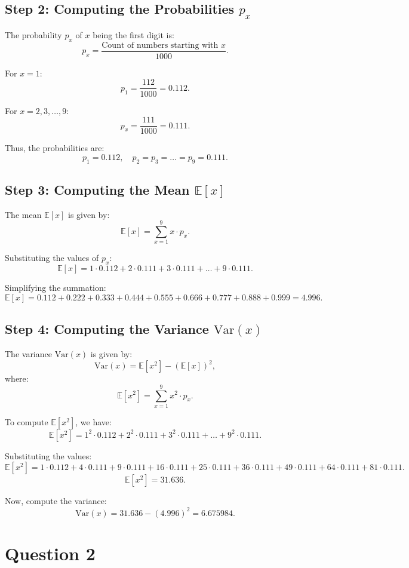 \documentclass[12pt]{article}
\begin{document}
\subsection*{Step 2: Computing the Probabilities \( p_x \)}

The probability \( p_x \) of \( x \) being the first digit is:
\[
p_x = \frac{\text{Count of numbers starting with } x}{1000}.
\]

For \( x = 1 \):
\[
p_1 = \frac{112}{1000} = 0.112.
\]

For \( x = 2, 3, \dots, 9 \):
\[
p_x = \frac{111}{1000} = 0.111.
\]

Thus, the probabilities are:
\[
p_1 = 0.112, \quad p_2 = p_3 = \dots = p_9 = 0.111.
\]

\subsection*{Step 3: Computing the Mean \( \mathbb{E}[x] \)}

The mean \( \mathbb{E}[x] \) is given by:
\[
\mathbb{E}[x] = \sum_{x=1}^9 x \cdot p_x.
\]

Substituting the values of \( p_x \):
\[
\mathbb{E}[x] = 1 \cdot 0.112 + 2 \cdot 0.111 + 3 \cdot 0.111 + \dots + 9 \cdot 0.111.
\]

Simplifying the summation:
\[
\mathbb{E}[x] = 0.112 + 0.222 + 0.333 + 0.444 + 0.555 + 0.666 + 0.777 + 0.888 + 0.999 = 4.996.
\]

\subsection*{Step 4: Computing the Variance \( \mathrm{Var}(x) \)}

The variance \( \mathrm{Var}(x) \) is given by:
\[
\mathrm{Var}(x) = \mathbb{E}[x^2] - (\mathbb{E}[x])^2,
\]
where:
\[
\mathbb{E}[x^2] = \sum_{x=1}^9 x^2 \cdot p_x.
\]

To compute \( \mathbb{E}[x^2] \), we have:
\[
\mathbb{E}[x^2] = 1^2 \cdot 0.112 + 2^2 \cdot 0.111 + 3^2 \cdot 0.111 + \dots + 9^2 \cdot 0.111.
\]

Substituting the values:
\[
\mathbb{E}[x^2] = 1 \cdot 0.112 + 4 \cdot 0.111 + 9 \cdot 0.111 + 16 \cdot 0.111 + 25 \cdot 0.111 + 36 \cdot 0.111 + 49 \cdot 0.111 + 64 \cdot 0.111 + 81 \cdot 0.111.
\]
\[
\mathbb{E}[x^2] = 31.636.
\]

Now, compute the variance:
\[
\mathrm{Var}(x) = 31.636 - (4.996)^2 = 6.675984.
\]

\section*{Question 2}
\end{document}
